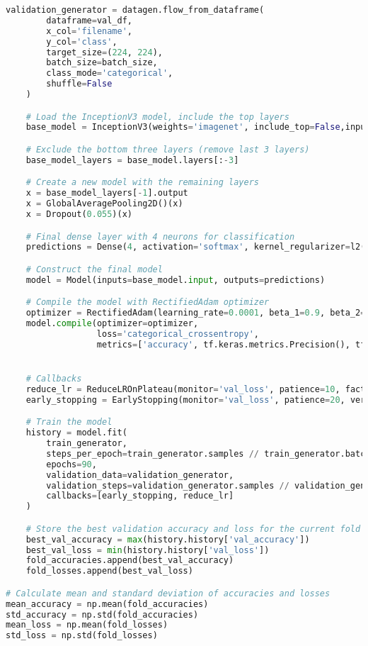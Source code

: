 \begin{lstlisting}[language=Python]
    validation_generator = datagen.flow_from_dataframe(
        dataframe=val_df,
        x_col='filename',
        y_col='class',
        target_size=(224, 224),
        batch_size=batch_size,
        class_mode='categorical',
        shuffle=False
    )

    # Load the InceptionV3 model, include the top layers
    base_model = InceptionV3(weights='imagenet', include_top=False,input_shape=(224,224,3))

    # Exclude the bottom three layers (remove last 3 layers)
    base_model_layers = base_model.layers[:-3]

    # Create a new model with the remaining layers
    x = base_model_layers[-1].output
    x = GlobalAveragePooling2D()(x)
    x = Dropout(0.055)(x)

    # Final dense layer with 4 neurons for classification
    predictions = Dense(4, activation='softmax', kernel_regularizer=l2(0.1), dtype='float64')(x)

    # Construct the final model
    model = Model(inputs=base_model.input, outputs=predictions)

    # Compile the model with RectifiedAdam optimizer
    optimizer = RectifiedAdam(learning_rate=0.0001, beta_1=0.9, beta_2=0.999, epsilon=1e-08)
    model.compile(optimizer=optimizer,
                  loss='categorical_crossentropy',
                  metrics=['accuracy', tf.keras.metrics.Precision(), tf.keras.metrics.Recall(), 'categorical_accuracy'])


    # Callbacks
    reduce_lr = ReduceLROnPlateau(monitor='val_loss', patience=10, factor=0.3, min_lr=1e-6, verbose=1)
    early_stopping = EarlyStopping(monitor='val_loss', patience=20, verbose=1, mode='auto')

    # Train the model
    history = model.fit(
        train_generator,
        steps_per_epoch=train_generator.samples // train_generator.batch_size,
        epochs=90,
        validation_data=validation_generator,
        validation_steps=validation_generator.samples // validation_generator.batch_size,
        callbacks=[early_stopping, reduce_lr]
    )

    # Store the best validation accuracy and loss for the current fold
    best_val_accuracy = max(history.history['val_accuracy'])
    best_val_loss = min(history.history['val_loss'])
    fold_accuracies.append(best_val_accuracy)
    fold_losses.append(best_val_loss)

# Calculate mean and standard deviation of accuracies and losses
mean_accuracy = np.mean(fold_accuracies)
std_accuracy = np.std(fold_accuracies)
mean_loss = np.mean(fold_losses)
std_loss = np.std(fold_losses)


\end{lstlisting}
